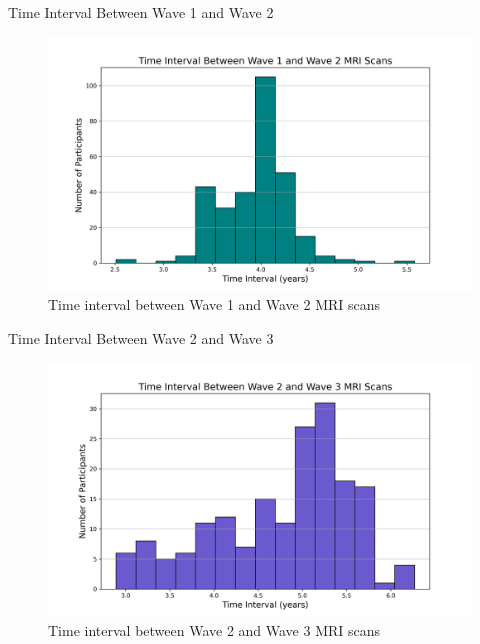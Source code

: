 \documentclass{beamer}
\begin{document}
\begin{frame}{Time Interval Between Wave 1 and Wave 2}
  \begin{figure}
    \centering
    \includegraphics[width=0.8\linewidth]{mri_time_interval_w1_w2.png}
    \caption{Time interval between Wave 1 and Wave 2 MRI scans}
  \end{figure}
\end{frame}

\begin{frame}{Time Interval Between Wave 2 and Wave 3}
  \begin{figure}
    \centering
    \includegraphics[width=0.8\linewidth]{mri_time_interval_w2_w3.png}
    \caption{Time interval between Wave 2 and Wave 3 MRI scans}
  \end{figure}
\end{frame}
\end{document}
